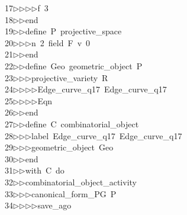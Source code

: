 \begin{tabbing}
17\>$\triangleright$\>$\triangleright$\>$\triangleright$\>$\triangleright$\>f\ 3\ \\[0pt]
18\>$\triangleright$\>$\triangleright$\>end\ \\[0pt]
19\>$\triangleright$\>$\triangleright$\>define\ P\ projective\_space\ \\[0pt]
20\>$\triangleright$\>$\triangleright$\>$\triangleright$\>n\ 2\ field\ F\ v\ 0\ \\[0pt]
21\>$\triangleright$\>$\triangleright$\>end\ \\[0pt]
22\>$\triangleright$\>$\triangleright$\>define\ Geo\ geometric\_object\ P\ \\[0pt]
23\>$\triangleright$\>$\triangleright$\>$\triangleright$\>projective\_variety\ R\ \\[0pt]
24\>$\triangleright$\>$\triangleright$\>$\triangleright$\>$\triangleright$\>Edge\_curve\_q17\ Edge\_curve\_q17\ \\[0pt]
25\>$\triangleright$\>$\triangleright$\>$\triangleright$\>$\triangleright$\>Eqn\ \\[0pt]
26\>$\triangleright$\>$\triangleright$\>end\ \\[0pt]
27\>$\triangleright$\>$\triangleright$\>define\ C\ combinatorial\_object\ \\[0pt]
28\>$\triangleright$\>$\triangleright$\>$\triangleright$\>label\ Edge\_curve\_q17\ Edge\_curve\_q17\ \\[0pt]
29\>$\triangleright$\>$\triangleright$\>$\triangleright$\>geometric\_object\ Geo\ \\[0pt]
30\>$\triangleright$\>$\triangleright$\>end\ \\[0pt]
31\>$\triangleright$\>$\triangleright$\>with\ C\ do\ \\[0pt]
32\>$\triangleright$\>$\triangleright$\>combinatorial\_object\_activity\ \\[0pt]
33\>$\triangleright$\>$\triangleright$\>$\triangleright$\>canonical\_form\_PG\ P\ \\[0pt]
34\>$\triangleright$\>$\triangleright$\>$\triangleright$\>$\triangleright$\>save\_ago\ \\[0pt]

\end{tabbing}
